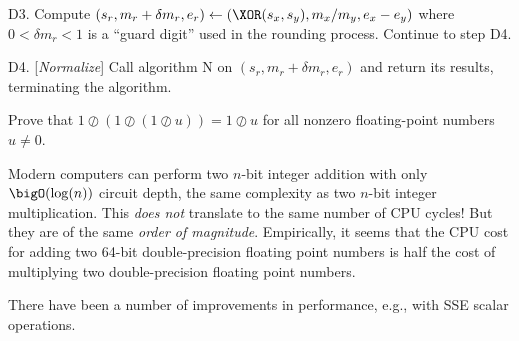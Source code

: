 \algstep D3. Compute $(s_{r},m_{r} + \delta m_{r},e_{r})\gets (\XOR(s_{x},s_{y}),m_{x}/m_{y},e_{x}-e_{y})$
where $0<\delta m_{r}<1$ is a ``guard digit'' used in the rounding
process. Continue to step D4.

\algstep D4. [{\it Normalize\/}] Call algorithm N on
$(s_{r}, m_{r}+\delta m_{r}, e_{r})$ and return its results, terminating
the algorithm.\quad\slug

\begin{xca}
  Prove that $1\oslash(1\oslash (1\oslash u))=1\oslash u$ for all
  nonzero floating-point numbers $u\neq 0$.
\end{xca}

\begin{rmk}
  Modern computers can perform two $n$-bit integer addition with only
  $\bigO(\log(n))$ circuit depth, the same complexity as two $n$-bit
  integer multiplication. This \emph{does not} translate to the same
  number of CPU cycles! But they are of the same \emph{order of magnitude}.
  Empirically, it seems that the CPU cost for adding two 64-bit
  double-precision floating point numbers is half the cost of multiplying two
  double-precision floating point numbers.

  There have been a number of improvements in performance, e.g., with
  SSE scalar operations.
\end{rmk}
